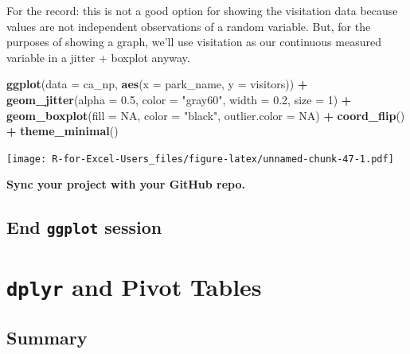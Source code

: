 \documentclass[]{book}
\newenvironment{Shaded}{\begin{snugshade}}{\end{snugshade}}
\newcommand{\DataTypeTok}[1]{\textcolor[rgb]{0.13,0.29,0.53}{#1}}
\newcommand{\DecValTok}[1]{\textcolor[rgb]{0.00,0.00,0.81}{#1}}
\newcommand{\FloatTok}[1]{\textcolor[rgb]{0.00,0.00,0.81}{#1}}
\newcommand{\KeywordTok}[1]{\textcolor[rgb]{0.13,0.29,0.53}{\textbf{#1}}}
\newcommand{\NormalTok}[1]{#1}
\newcommand{\OperatorTok}[1]{\textcolor[rgb]{0.81,0.36,0.00}{\textbf{#1}}}
\newcommand{\OtherTok}[1]{\textcolor[rgb]{0.56,0.35,0.01}{#1}}
\newcommand{\StringTok}[1]{\textcolor[rgb]{0.31,0.60,0.02}{#1}}
\begin{document}
For the record: this is not a good option for showing the visitation data because values are not independent observations of a random variable. But, for the purposes of showing a graph, we'll use visitation as our continuous measured variable in a jitter + boxplot anyway.

\begin{Shaded}
\begin{Highlighting}[]
\KeywordTok{ggplot}\NormalTok{(}\DataTypeTok{data =}\NormalTok{ ca_np, }\KeywordTok{aes}\NormalTok{(}\DataTypeTok{x =}\NormalTok{ park_name, }\DataTypeTok{y =}\NormalTok{ visitors)) }\OperatorTok{+}
\StringTok{  }\KeywordTok{geom_jitter}\NormalTok{(}\DataTypeTok{alpha =} \FloatTok{0.5}\NormalTok{,}
              \DataTypeTok{color =} \StringTok{"gray60"}\NormalTok{,}
              \DataTypeTok{width =} \FloatTok{0.2}\NormalTok{,}
              \DataTypeTok{size =} \DecValTok{1}\NormalTok{) }\OperatorTok{+}
\StringTok{  }\KeywordTok{geom_boxplot}\NormalTok{(}\DataTypeTok{fill =} \OtherTok{NA}\NormalTok{,}
               \DataTypeTok{color =} \StringTok{"black"}\NormalTok{,}
               \DataTypeTok{outlier.color =} \OtherTok{NA}\NormalTok{) }\OperatorTok{+}
\StringTok{  }\KeywordTok{coord_flip}\NormalTok{() }\OperatorTok{+}
\StringTok{  }\KeywordTok{theme_minimal}\NormalTok{()}
\end{Highlighting}
\end{Shaded}

\texttt{[image: R-for-Excel-Users\_files/figure-latex/unnamed-chunk-47-1.pdf]}

\textbf{Sync your project with your GitHub repo.}

\hypertarget{end-ggplot-session}{%
\section{\texorpdfstring{End \texttt{ggplot} session}{End ggplot session}}\label{end-ggplot-session}}

\hypertarget{pivot}{%
\chapter{\texorpdfstring{\texttt{dplyr} and Pivot Tables}{dplyr and Pivot Tables}}\label{pivot}}

\hypertarget{summary-3}{%
\section{Summary}\label{summary-3}}
\end{document}
